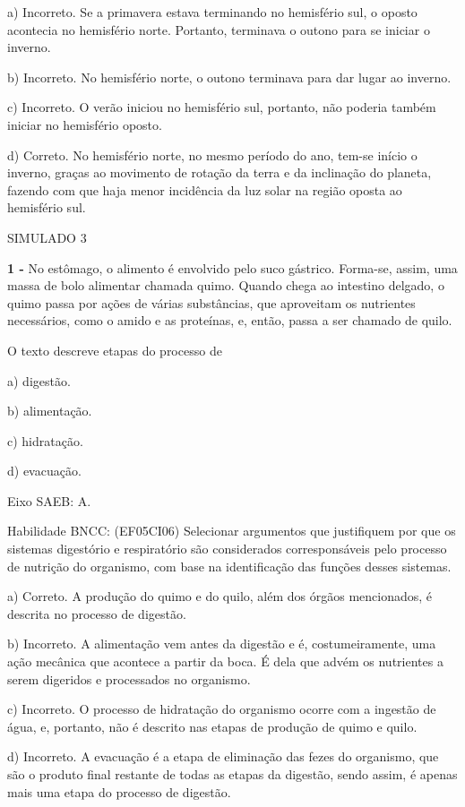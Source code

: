 a) Incorreto. Se a primavera estava terminando no hemisfério sul, o
oposto acontecia no hemisfério norte. Portanto, terminava o outono para
se iniciar o inverno.

b) Incorreto. No hemisfério norte, o outono terminava para dar lugar ao
inverno.

c) Incorreto. O verão iniciou no hemisfério sul, portanto, não poderia
também iniciar no hemisfério oposto.

d) Correto. No hemisfério norte, no mesmo período do ano, tem-se início
o inverno, graças ao movimento de rotação da terra e da inclinação do
planeta, fazendo com que haja menor incidência da luz solar na região
oposta ao hemisfério sul.

\protect\hypertarget{_cq2n6xdnbnyq}{}{}SIMULADO 3

\textbf{1 -} No estômago, o alimento é envolvido pelo suco gástrico.
Forma-se, assim, uma massa de bolo alimentar chamada quimo. Quando chega
ao intestino delgado, o quimo passa por ações de várias substâncias, que
aproveitam os nutrientes necessários, como o amido e as proteínas, e,
então, passa a ser chamado de quilo.

O texto descreve etapas do processo de

a) digestão.

b) alimentação.

c) hidratação.

d) evacuação.

Eixo SAEB: A.

Habilidade BNCC: (EF05CI06) Selecionar argumentos que justifiquem por
que os sistemas digestório e respiratório são considerados
corresponsáveis pelo processo de nutrição do organismo, com base na
identificação das funções desses sistemas.

a) Correto. A produção do quimo e do quilo, além dos órgãos mencionados,
é descrita no processo de digestão.

b) Incorreto. A alimentação vem antes da digestão e é, costumeiramente,
uma ação mecânica que acontece a partir da boca. É dela que advém os
nutrientes a serem digeridos e processados no organismo.

c) Incorreto. O processo de hidratação do organismo ocorre com a
ingestão de água, e, portanto, não é descrito nas etapas de produção de
quimo e quilo.

d) Incorreto. A evacuação é a etapa de eliminação das fezes do
organismo, que são o produto final restante de todas as etapas da
digestão, sendo assim, é apenas mais uma etapa do processo de digestão.

